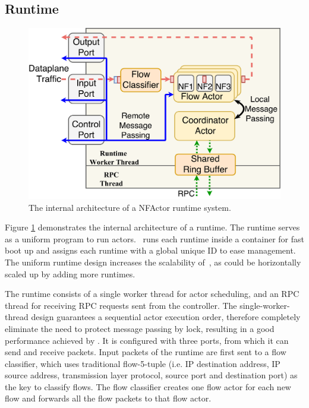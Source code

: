 
\subsection{Runtime}
\label{sec:runtime}

\begin{figure}
		\centering
		\includegraphics[width=\columnwidth]{figure/new-nfactor-runtime-arch.pdf}

		\caption{The internal architecture of a NFActor runtime system. }
\label{fig:runtime-arch}
\end{figure}

Figure \ref{fig:runtime-arch} demonstrates the internal architecture of a runtime. The runtime serves as a uniform program to run actors. \nfactor~runs each runtime inside a container for fast boot up and assigns each runtime with a global unique ID to ease management. The uniform runtime design increases the scalability of~\nfactor, as \nfactor could be horizontally scaled up by adding more runtimes.

The runtime consists of a single worker thread for actor scheduling, and an RPC thread for receiving RPC requests sent from the controller. The single-worker-thread design guarantees a sequential actor execution order, therefore completely eliminate the need to protect message passing by lock, resulting in a good performance achieved by \nfactor. It is configured with three ports, from which it can send and receive packets. Input packets of the runtime are first sent to a flow classifier, which uses traditional flow-5-tuple (i.e. IP destination address, IP source address, transmission layer protocol, source port and destination port) as the key to classify flows. The flow classifier creates one flow actor for each new flow and forwards all the flow packets to that flow actor.

